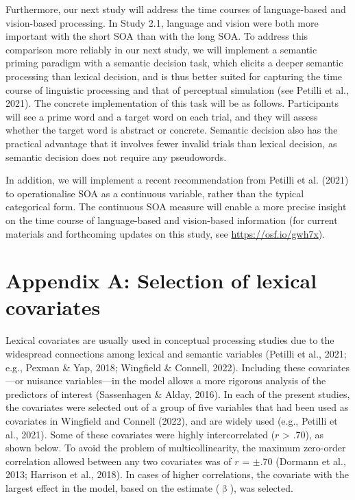 \documentclass[
  12pt,
  man,floatsintext]{apa7}
\renewcommand\appendix{}
\begin{document}
Furthermore, our next study will address the time courses of language-based and vision-based processing. In Study 2.1, language and vision were both more important with the short SOA than with the long SOA. To address this comparison more reliably in our next study, we will implement a semantic priming paradigm with a semantic decision task, which elicits a deeper semantic processing than lexical decision, and is thus better suited for capturing the time course of linguistic processing and that of perceptual simulation (see Petilli et al., 2021). The concrete implementation of this task will be as follows. Participants will see a prime word and a target word on each trial, and they will assess whether the target word is abstract or concrete. Semantic decision also has the practical advantage that it involves fewer invalid trials than lexical decision, as semantic decision does not require any pseudowords.

In addition, we will implement a recent recommendation from Petilli et al. (2021) to operationalise SOA as a continuous variable, rather than the typical categorical form. The continuous SOA measure will enable a more precise insight on the time course of language-based and vision-based information (for current materials and forthcoming updates on this study, see \url{https://osf.io/gwh7x}).

\clearpage

\hypertarget{appendix-appendix}{%
\appendix}


\renewcommand{\thefigure}{A\arabic{figure}} \setcounter{figure}{0}
\renewcommand{\thetable}{A\arabic{table}} \setcounter{table}{0}

\hypertarget{appendix-A-lexical-covariates}{%
\section{Appendix A: Selection of lexical covariates}\label{appendix-A-lexical-covariates}}

Lexical covariates are usually used in conceptual processing studies due to the widespread connections among lexical and semantic variables (Petilli et al., 2021; e.g., Pexman \& Yap, 2018; Wingfield \& Connell, 2022). Including these covariates---or nuisance variables---in the model allows a more rigorous analysis of the predictors of interest (Sassenhagen \& Alday, 2016). In each of the present studies, the covariates were selected out of a group of five variables that had been used as covariates in Wingfield and Connell (2022), and are widely used (e.g., Petilli et al., 2021). Some of these covariates were highly intercorrelated (\(r\) \textgreater{} .70), as shown below. To avoid the problem of multicollinearity, the maximum zero-order correlation allowed between any two covariates was of \(r\) = \(\pm\).70 (Dormann et al., 2013; Harrison et al., 2018). In cases of higher correlations, the covariate with the largest effect in the model, based on the estimate (\(\upbeta\)), was selected.
\end{document}
